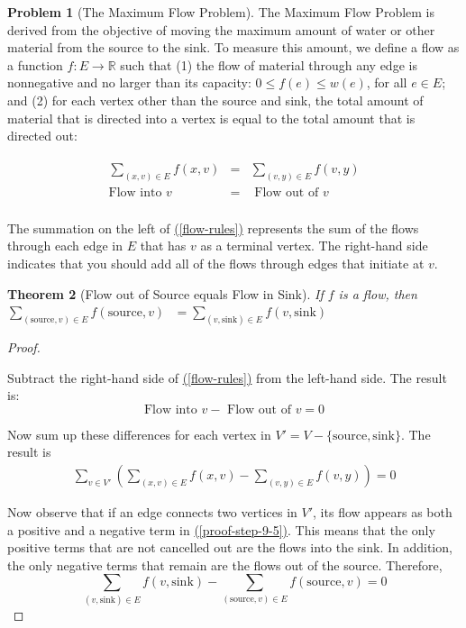\documentclass[10pt,]{book}
\theoremstyle{plain}
\newtheorem{theorem}{Theorem}[section]
\theoremstyle{definition}
\theoremstyle{definition}
\theoremstyle{definition}
\newtheorem{problem}[theorem]{Problem}
\theoremstyle{definition}
\theoremstyle{definition}
\numberwithin{equation}{section}
\begin{document}
\begin{problem}[The Maximum Flow Problem]\label{problem-maximal-flow}
The Maximum Flow Problem is derived from the objective of moving the maximum amount of water or other material from the source to the sink. To measure this amount, we define a flow as a function \(f: E \to \mathbb{R}\) such that (1) the flow of material through any edge is nonnegative and no larger
than its capacity: \(0 \leq  f(e) \leq  w(e)\), for all \(e\in  E\); and (2) for each vertex other than the source and sink, the total amount of material that is directed into a vertex is equal to the total amount that is directed out:

\begin{align}
\begin{array}{ccc}
 \sum_{(x,v)\in E} f(x,v)  & = & \sum_{(v,y)\in E} f(v,y) \\
 \textrm{Flow into } v & = & \textrm{ Flow out of } v \\
\end{array}\label{flow-rules}
\end{align}

The summation on the left of \hyperref[flow-rules]{(\ref{flow-rules})} represents the sum of the flows through each edge in \(E\) that has \(v\) as a terminal vertex.
The right-hand side indicates that you should add all of the flows through edges that initiate at \(v\).%
\end{problem}
\begin{theorem}[Flow out of Source equals Flow in Sink]\label{theorem-flow-inout}
 If \(f\) is a flow, then
\(\quad \quad\)\(\sum_{(\text{source},v)\in E} f(\text{source},v)\text{  }=\sum_{(v,\text{sink})\in E} f(v,\text{sink})\)  %
\end{theorem}
\begin{proof}\hypertarget{proof-4}{}
Subtract the right-hand side of \hyperref[flow-rules]{(\ref{flow-rules})} from the left-hand side. The result is: 
\[\text{Flow into } v - \text{ Flow out of } v = 0\]

 Now sum up these differences for each vertex in \(V' = V - \{\text{source}, \text{sink}\}\). The result is
\begin{gather}
\sum_{v\in V'}  \left(\sum_{(x,v)\in E} f(x,v)-\sum_{(v,y)\in E} f(v,y)\right)= 0\label{proof-step-9-5}
\end{gather}
%
\par
Now observe that if an edge connects two vertices in \(V'\), its flow appears as both a positive and a negative term in \hyperref[proof-step-9-5]{(\ref{proof-step-9-5})}. This means that the only positive terms that are not cancelled out are the flows into the sink. In addition, the only negative terms that remain are the flows out of the
source. Therefore,
\[\sum_{(v,\text{sink})\in E} f(v,\text{sink})-\sum_{(\text{source},v)\in E} f(\text{source},v) =0\]%
\end{proof}
\end{document}

